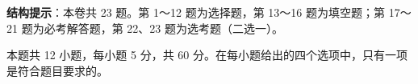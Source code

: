 


\begin{gktip}
\textbf{结构提示}：本卷共 23 题。第 1～12 题为选择题，第 13～16 题为填空题；第 17～21 题为必考解答题，第 22、23 题为选考题（二选一）。
\end{gktip}

\par\medskip


\begin{gktip}
本题共 12 小题，每小题 5 分，共 60 分。在每小题给出的四个选项中，只有一项是符合题目要求的。
\end{gktip}

